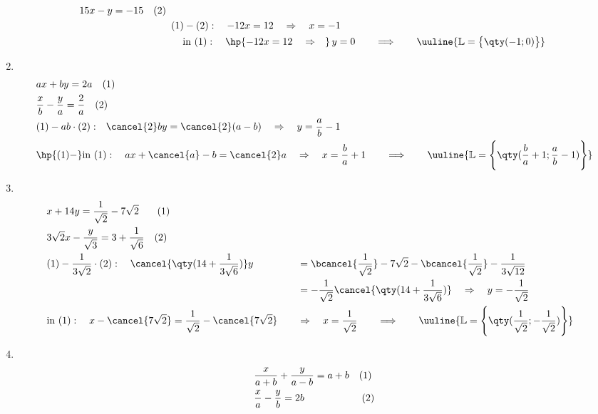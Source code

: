 \begin{enumerate}[label=(\alph*)]
\begin{align}
\begin{array}{l}
            15x -y = -15 \quad (2)
        \end{array} \\
        &(1) - (2): \quad -12x = 12 \quad \Rightarrow \quad  x = -1\\
        &\quad\,\text{in } (1): \quad \hp{-12x = 12\quad \Rightarrow \quad} \,y = 0 \qquad \Longrightarrow \qquad \uuline{\mathbb{L} = \big\{\qty(-1;0)\big\}}
    \end{align}
    \item $~$\\[-1.45cm] 
    \begin{align}
        &ax+by=2a \quad (1)\\
        &\frac{x}{b}-\frac{y}{a}=\frac{2}{a} \quad (2)\\
        &(1) - ab \cdot (2): \;\;\,\cancel{2}by = \cancel{2}(a-b) \quad \Rightarrow \quad y = \frac{a}{b}-1 \\
        &\hp{(1)-}\text{in } (1): \quad ax + \cancel{a} -b = \cancel{2}a \quad \Rightarrow \quad x=\frac{b}{a}+ 1 \qquad \Longrightarrow \qquad \uuline{\mathbb{L} = \Bigg\{\qty(\frac{b}{a}+1;\frac{a}{b}-1)\Bigg\}}
    \end{align}
    \item $~$\\[-1.45cm] 
    \begin{alignat*}{2}
        &x+14y=\frac{1}{\sqrt{2}}-7\sqrt{2} \;\;\;\quad (1)\\
        &3\sqrt{2}x-\frac{y}{\sqrt{3}}=3+\frac{1}{\sqrt{6}} \quad (2)\\
        &(1) - \frac{1}{3\sqrt{2}}\cdot (2): \quad\cancel{\qty(14+\frac{1}{3\sqrt{6}})}y &&= \bcancel{\frac{1}{\sqrt{2}}} - 7\sqrt{2} - \bcancel{\frac{1}{\sqrt{2}}} - \frac{1}{3\sqrt{12}} \\
        & &&= -\frac{1}{\sqrt{2}} \cancel{\qty(14+\frac{1}{3\sqrt{6}})} \quad \Rightarrow \quad y = -\frac{1}{\sqrt{2}} \\
        & \text{in } (1): \quad x-\cancel{7\sqrt{2}} = \frac{1}{\sqrt{2}} - \cancel{7\sqrt{2}} \quad &&\Rightarrow \quad x = \frac{1}{\sqrt{2}} \qquad \Longrightarrow \qquad \uuline{\mathbb{L} = \Bigg\{\qty(\frac{1}{\sqrt{2}};-\frac{1}{\sqrt{2}})\Bigg\}}
    \end{alignat*}
    \item $~$\\[-1.45cm] 
    \begin{alignat*}{3}
        &\frac{x}{a+b}+\frac{y}{a-b}=a+b \quad (1)\\
        &\frac{x}{a}-\frac{y}{b}=2b \hspace{1.68cm}\quad (2) \\

\end{alignat*}
\end{enumerate}
